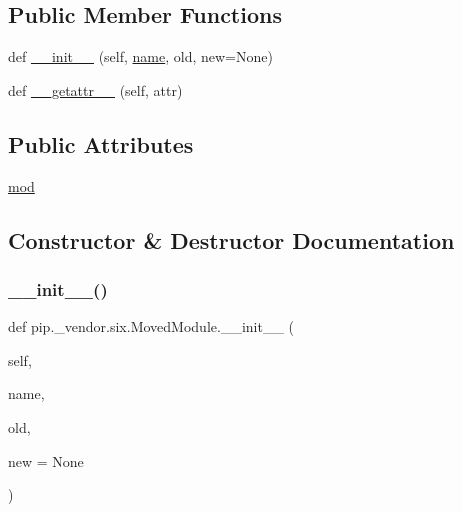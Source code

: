 \subsection*{Public Member Functions}
\begin{DoxyCompactItemize}
\item 
def \hyperlink{classpip_1_1__vendor_1_1six_1_1MovedModule_afd2ce7468d4eaa788bf64ac337a691d6}{\+\_\+\+\_\+init\+\_\+\+\_\+} (self, \hyperlink{classpip_1_1__vendor_1_1six_1_1__LazyDescr_ac79dd785588d4b38378ddb12da59caf2}{name}, old, new=None)
\item 
def \hyperlink{classpip_1_1__vendor_1_1six_1_1MovedModule_a438db2df291a2473135d36e08425351c}{\+\_\+\+\_\+getattr\+\_\+\+\_\+} (self, attr)
\end{DoxyCompactItemize}
\subsection*{Public Attributes}
\begin{DoxyCompactItemize}
\item 
\hyperlink{classpip_1_1__vendor_1_1six_1_1MovedModule_ae64e8dfff8147445f24bab37c75035b6}{mod}
\end{DoxyCompactItemize}


\subsection{Constructor \& Destructor Documentation}
\mbox{\label{classpip_1_1__vendor_1_1six_1_1MovedModule_afd2ce7468d4eaa788bf64ac337a691d6}} 
\subsubsection{\texorpdfstring{\+\_\+\+\_\+init\+\_\+\+\_\+()}{\_\_init\_\_()}}
{\footnotesize\ttfamily def pip.\+\_\+vendor.\+six.\+Moved\+Module.\+\_\+\+\_\+init\+\_\+\+\_\+ (\begin{DoxyParamCaption}\item[{}]{self,  }\item[{}]{name,  }\item[{}]{old,  }\item[{}]{new = {\ttfamily None} }\end{DoxyParamCaption})}



